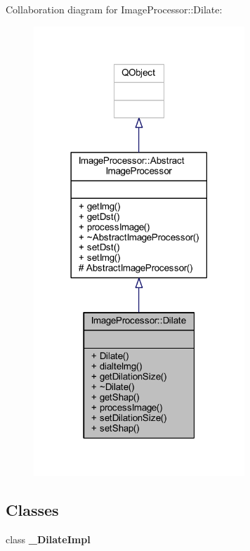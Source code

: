 Collaboration diagram for Image\+Processor\+:\+:Dilate\+:\nopagebreak
\begin{figure}[H]
\begin{center}
\leavevmode
\includegraphics[width=225pt]{d6/d27/class_image_processor_1_1_dilate__coll__graph}
\end{center}
\end{figure}
\subsection*{Classes}
\begin{DoxyCompactItemize}
\item 
class {\bfseries \+\_\+\+Dilate\+Impl}
\end{DoxyCompactItemize}

